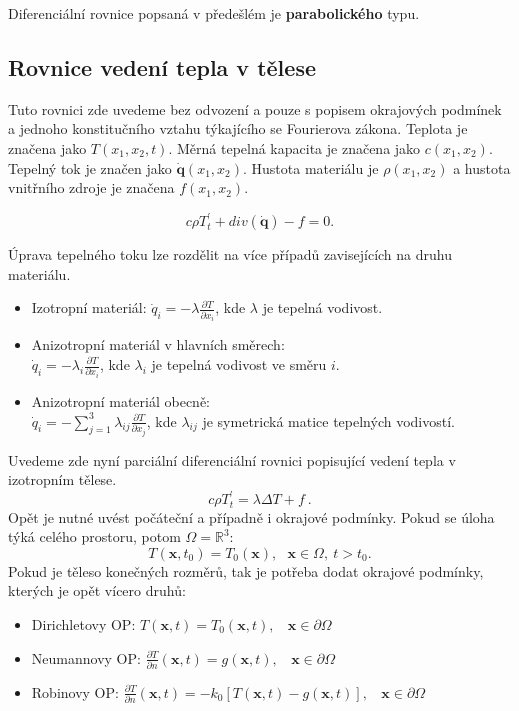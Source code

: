 \documentclass[a4]{report}
\theoremstyle{definition}
\begin{document}
Diferenciální rovnice popsaná v předešlém je \textbf{parabolického} typu.

\subsection{Rovnice vedení tepla v tělese}
Tuto rovnici zde uvedeme bez odvození a pouze s popisem okrajových podmínek a jednoho konstitučního vztahu týkajícího se Fourierova zákona. Teplota je značena jako $T(x_1,x_2,t)$. Měrná tepelná kapacita je značena jako $c(x_1,x_2)$. Tepelný tok je značen jako $\mathbf{\dot{q}}(x_1,x_2)$. Hustota materiálu je $\rho (x_1,x_2)$ a hustota vnitřního zdroje je značena $f(x_1,x_2)$.

\begin{equation}
c \rho T_t^\prime+div(\mathbf{\dot{q}})-f=0 .
\end{equation}

Úprava tepelného toku lze rozdělit na více případů zavisejících na druhu materiálu.
\begin{itemize}
\item Izotropní materiál:
$\dot{q}_i=-\lambda\frac{\partial T}{\partial x_i}$, kde $\lambda$ je tepelná vodivost.
\item Anizotropní materiál v hlavních směrech:\\
$\dot{q}_i=-\lambda_i \frac{\partial T}{\partial x_i}$, kde $\lambda_i$ je tepelná vodivost ve směru $i$.
\item Anizotropní materiál obecně:\\
$\dot{q}_i=-\sum_{j=1}^{3} \lambda_{ij}\frac{\partial T}{\partial x_j}$, kde $\lambda_{ij}$ je symetrická matice tepelných vodivostí.
\end{itemize}

Uvedeme zde nyní parciální diferenciální rovnici popisující vedení tepla v izotropním tělese.
\begin{equation}
c \rho T_t^\prime=\lambda\Delta T +f\ .
\label{diferencialnirovnicepopisujicivednitepla}    
\end{equation}
 Opět je nutné uvést počáteční a případně i okrajové podmínky. Pokud se úloha týká celého prostoru, potom $\Omega = \mathbb{R}^3$:
\begin{equation}
T(\mathbf{x},t_0)=T_0(\mathbf{x}),\ \ \ \mathbf{x}\in\Omega,\ t>t_0.
\label{pocatecnipodminkapopisujicivednitepla}   
\end{equation}
Pokud je těleso konečných rozměrů, tak je potřeba dodat okrajové podmínky, \mbox{kterých} je opět vícero druhů:
\begin{itemize}

\item Dirichletovy OP: $T(\mathbf{x},t)=T_0(\mathbf{x},t), \ \ \ \ \mathbf{x}\in \partial\Omega $
\item Neumannovy OP: $ \frac{\partial T}{\partial n}(\mathbf{x},t)=g(\mathbf{x},t),  \ \ \ \ \mathbf{x}\in \partial\Omega      $

\item Robinovy OP: $ \frac{\partial T}{\partial n}(\mathbf{x},t)=-k_0 [T(\mathbf{x},t)-g(\mathbf{x},t) ],\ \ \ \ \mathbf{x}\in\partial\Omega$

\end{itemize}
\end{document}
